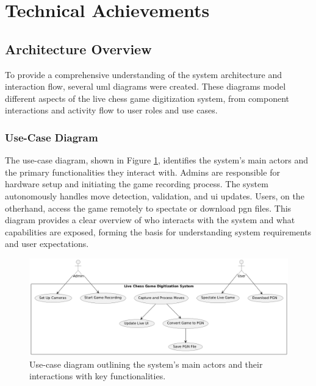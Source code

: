 \section{Technical Achievements}

\subsection{Architecture Overview}
\label{subsec:diagrams}

To provide a comprehensive understanding of the system architecture and interaction flow, several \gls{uml} diagrams were created. These diagrams model different aspects of the live chess game digitization system, from component interactions and activity flow to user roles and use cases.



\subsubsection*{Use-Case Diagram}
\label{subsubsec:use-case-diagram}

The use-case diagram, shown in Figure \ref{fig:use-case}, identifies the system’s main actors and the primary functionalities they interact with. Admins are responsible for hardware setup and initiating the game recording process. The system autonomously handles move detection, validation, and \gls{ui} updates. Users, on the otherhand, access the game remotely to spectate or download \gls{pgn} files. This diagram provides a clear overview of who interacts with the system and what capabilities are exposed, forming the basis for understanding system requirements and user expectations.

\begin{figure}[h!]
    \centering
    \includegraphics[width=0.75\linewidth]{figures/results/uml/use-case.png}
    \caption[Use-case diagram]{Use-case diagram outlining the system’s main actors and their interactions with key functionalities.}
    \label{fig:use-case}
\end{figure}  

\newpage

